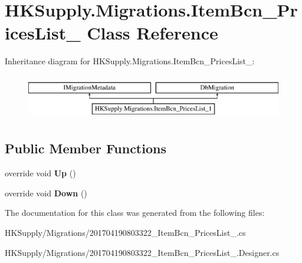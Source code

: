 \hypertarget{class_h_k_supply_1_1_migrations_1_1_item_bcn___prices_list__1}{}\section{H\+K\+Supply.\+Migrations.\+Item\+Bcn\+\_\+\+Prices\+List\+\_ Class Reference}
\label{class_h_k_supply_1_1_migrations_1_1_item_bcn___prices_list__1}
Inheritance diagram for H\+K\+Supply.\+Migrations.\+Item\+Bcn\+\_\+\+Prices\+List\+\_\+:\begin{figure}[H]
\begin{center}
\leavevmode
\includegraphics[height=2.000000cm]{class_h_k_supply_1_1_migrations_1_1_item_bcn___prices_list__1}
\end{center}
\end{figure}
\subsection*{Public Member Functions}
\begin{DoxyCompactItemize}
\item 
\mbox{\label{class_h_k_supply_1_1_migrations_1_1_item_bcn___prices_list__1_a7ffc4052fc2ce997027ddd5c8418644a}} 
override void {\bfseries Up} ()
\item 
\mbox{\label{class_h_k_supply_1_1_migrations_1_1_item_bcn___prices_list__1_af04b6f3e008f7eeffd0018dc8a8e365d}} 
override void {\bfseries Down} ()
\end{DoxyCompactItemize}


The documentation for this class was generated from the following files\+:\begin{DoxyCompactItemize}
\item 
H\+K\+Supply/\+Migrations/201704190803322\+\_\+\+Item\+Bcn\+\_\+\+Prices\+List\+\_.\+cs\item 
H\+K\+Supply/\+Migrations/201704190803322\+\_\+\+Item\+Bcn\+\_\+\+Prices\+List\+\_.\+Designer.\+cs\end{DoxyCompactItemize}
